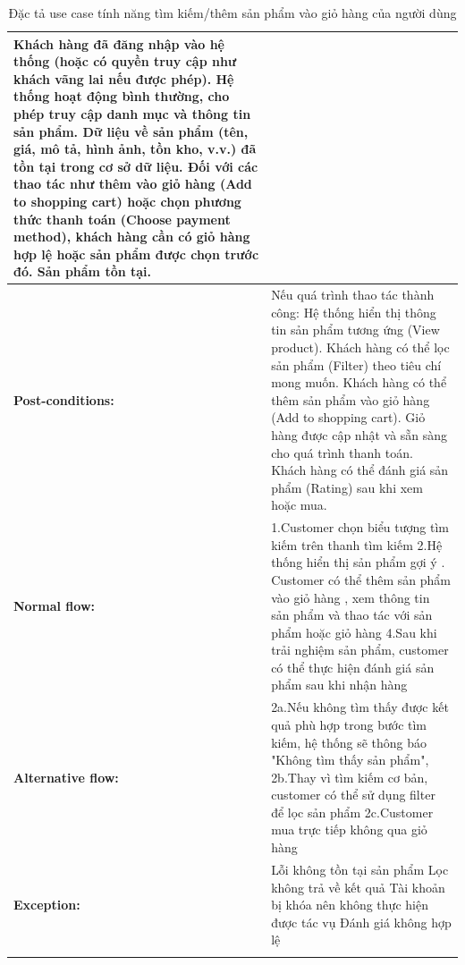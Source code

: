 \begin{longtable}{|>{\bfseries}p{4.5cm}|p{11cm}|}
Khách hàng đã đăng nhập vào hệ thống (hoặc có quyền truy cập như khách vãng lai nếu được phép). \newline
Hệ thống hoạt động bình thường, cho phép truy cập danh mục và thông tin sản phẩm. \newline
Dữ liệu về sản phẩm (tên, giá, mô tả, hình ảnh, tồn kho, v.v.) đã tồn tại trong cơ sở dữ liệu.\newline
Đối với các thao tác như thêm vào giỏ hàng (Add to shopping cart) hoặc chọn phương thức thanh toán (Choose payment method), khách hàng cần có giỏ hàng hợp lệ hoặc sản phẩm được chọn trước đó.\newline
Sản phẩm tồn tại. \\ \hline
Post-conditions: & 
Nếu quá trình thao tác thành công: \newline
Hệ thống hiển thị thông tin sản phẩm tương ứng (View product).\newline
Khách hàng có thể lọc sản phẩm (Filter) theo tiêu chí mong muốn.\newline
Khách hàng có thể thêm sản phẩm vào giỏ hàng (Add to shopping cart).\newline
Giỏ hàng được cập nhật và sẵn sàng cho quá trình thanh toán.\newline
Khách hàng có thể đánh giá sản phẩm (Rating) sau khi xem hoặc mua.
\\ \hline
Normal flow: &
1.Customer chọn biểu tượng tìm kiếm trên thanh tìm kiếm\newline
2.Hệ thống hiển thị sản phẩm gợi ý \newline
3. Customer có thể thêm sản phẩm vào giỏ hàng , xem thông tin sản phẩm và thao tác với sản phẩm hoặc giỏ hàng\newline
4.Sau khi trải nghiệm sản phẩm, customer có thể thực hiện đánh giá sản phẩm sau khi nhận hàng
\\ \hline
Alternative flow: &
2a.Nếu không tìm thấy được kết quả phù hợp trong bước tìm kiếm, hệ thống sẽ thông báo "Không tìm thấy sản phẩm", \newline
2b.Thay vì tìm kiếm cơ bản, customer có thể sử dụng filter để lọc sản phẩm\newline
2c.Customer mua trực tiếp không qua giỏ hàng
\\ \hline
Exception: &
Lỗi không tồn tại sản phẩm\newline
Lọc không trả về kết quả\newline
Tài khoản bị khóa nên không thực hiện được tác vụ\newline
Đánh giá không hợp lệ\newline
 \\ \hline
\caption{Đặc tả use case tính năng tìm kiếm/thêm sản phẩm vào giỏ hàng của người dùng }
\end{longtable}